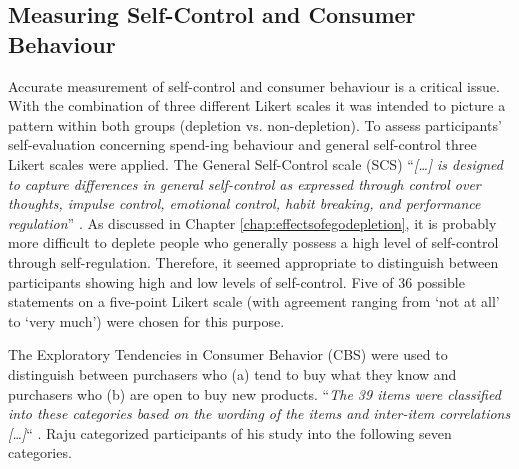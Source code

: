 \subsection{Measuring Self-Control and Consumer Behaviour}
Accurate measurement of self-control and consumer behaviour is a critical issue. With the combination of three different Likert scales it was intended to picture a pattern within both groups (depletion vs. non-depletion). To assess participants’ self-evaluation concerning spend-ing behaviour and general self-control three Likert scales were applied. The General Self-Control scale (SCS) “\emph{[\ldots] is designed to capture differences in general self-control as expressed through control over thoughts, impulse control, emotional control, habit breaking, and performance regulation}” \citep{tangney2004high}. As discussed in Chapter \ref{chap:effectsofegodepletion}, it is probably more difficult to deplete people who generally possess a high level of self-control through self-regulation. Therefore, it seemed appropriate to distinguish between participants showing high and low levels of self-control. Five of 36 possible statements on a five-point Likert scale (with agreement ranging from ‘not at all’ to ‘very much’) were chosen for this purpose.\par
The Exploratory Tendencies in Consumer Behavior (CBS) \citep{raju1980optimum} were used to distinguish between purchasers who (a) tend to buy what they know and purchasers who (b) are open to buy new products. “\emph{The 39 items were classified into these categories based on the wording of the items and inter-item correlations [\ldots]}“ \citep{raju1980optimum}. Raju categorized participants of his study into the following seven categories.\par

